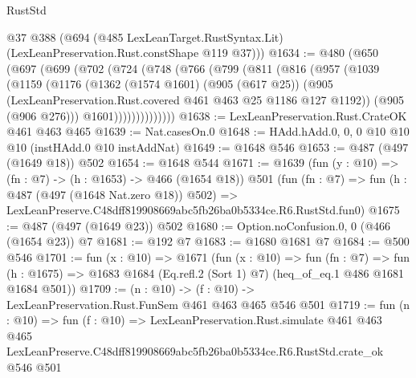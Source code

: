 \begin{lexlean}{RustStd}
\begin{coremodule}
      @37
      @388
      (@694 (@485 LexLeanTarget.RustSyntax.Lit) (LexLeanPreservation.Rust.constShape @119 @37)))
@1634 := @480
    (@650
      (@697
        (@699
          (@702
            (@724
              (@748
                (@766
                  (@799
                    (@811
                      (@816
                        (@957
                          (@1039
                            (@1159
                              (@1176
                                (@1362
                                  (@1574 @1601)
                                  (@905 (@617 @25))
                                  (@905
                                    (LexLeanPreservation.Rust.covered
                                      @461
                                      @463
                                      @25
                                      @1186
                                      @127
                                      @1192))
                                  (@905 (@906 @276)))
                                @1601))))))))))))))
@1638 := LexLeanPreservation.Rust.CrateOK @461 @463 @465
@1639 := Nat.casesOn.{0}
@1648 := HAdd.hAdd.{0, 0, 0} @10 @10 @10 (instHAdd.{0} @10 instAddNat)
@1649 := @1648 @546
@1653 := @487 (@497 (@1649 @18)) @502
@1654 := @1648 @544
@1671 := @1639
    (fun (y : @10) => (fn : @7) -> (h : @1653) -> @466 (@1654 @18))
    @501
    (fun (fn : @7) =>
    fun (h : @487 (@497 (@1648 Nat.zero @18)) @502) =>
    LexLeanPreserve.C48dff819908669abc5fb26ba0b5334ce.R6.RustStd.fun0)
@1675 := @487 (@497 (@1649 @23)) @502
@1680 := Option.noConfusion.{0, 0} (@466 (@1654 @23)) @7
@1681 := @192 @7
@1683 := @1680 @1681 @7
@1684 := @500 @546
@1701 := fun (x : @10) =>
  @1671
    (fun (x : @10) =>
    fun (fn : @7) =>
    fun (h : @1675) => @1683 @1684 (Eq.refl.{2} (Sort 1) @7) (heq_of_eq.{1} @486 @1681 @1684 @501))
@1709 := (n : @10) -> (f : @10) -> LexLeanPreservation.Rust.FunSem @461 @463 @465 @546 @501
@1719 := fun (n : @10) =>
  fun (f : @10) =>
  LexLeanPreservation.Rust.simulate
    @461
    @463
    @465
    LexLeanPreserve.C48dff819908669abc5fb26ba0b5334ce.R6.RustStd.crate_ok
    @546
    @501
\end{coremodule}
\end{lexlean}
